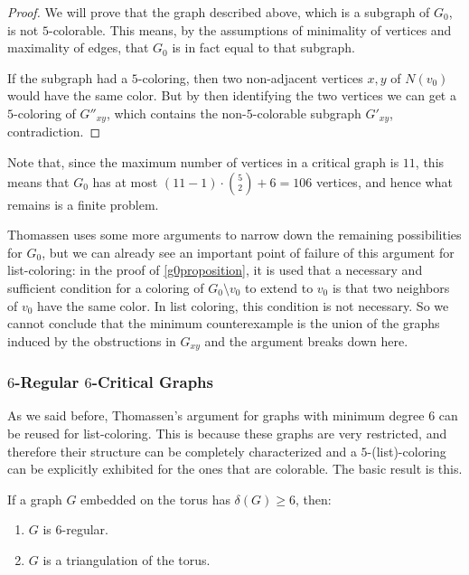 \begin{proof}
We will prove that the graph described above, which is a subgraph of $G_0$, is not $5$-colorable. 
This means, by the assumptions of minimality of vertices and maximality of edges, that $G_0$ is
in fact equal to that subgraph. 

If the subgraph had a $5$-coloring, then two non-adjacent vertices $x, y$ of $N(v_0)$ would 
have the same color. But by then identifying the two vertices we can get a $5$-coloring 
of $G''_{xy}$, which contains the non-$5$-colorable subgraph $G'_{xy}$, contradiction.

\end{proof}

Note that, since the maximum number of vertices in a critical graph is $11$, this means that
$G_0$ has at most $(11 - 1) \cdot \binom{5}{2} + 6 = 106$ vertices, and hence what remains
is a finite problem.

Thomassen uses some more arguments to narrow down the remaining possibilities for $G_0$, but
we can already see an important point of failure of this argument for list-coloring: in the 
proof of \ref{g0proposition}, it is used that a necessary and sufficient condition for a coloring
of $G_0 \setminus v_0$ to extend to $v_0$ is that two neighbors of $v_0$ have the same color.
In list coloring, this condition is not necessary. So we cannot conclude that the minimum 
counterexample is the union of the graphs induced by the obstructions in $G_{xy}$ and the 
argument breaks down here. 



\subsubsection{$6$-Regular $6$-Critical Graphs}

As we said before, Thomassen's argument for graphs with minimum degree $6$ can be reused for list-coloring. This is because these graphs are very restricted, and therefore their structure can be completely characterized and a $5$-(list)-coloring can be explicitly exhibited for the ones that are colorable. The basic result is this.

\begin{proposition}
If a graph $G$ embedded on the torus has $\delta(G) \geq 6$, then:

\begin{enumerate}
	\item $G$ is $6$-regular.
	\item $G$ is a triangulation of the torus.
\end{enumerate}
\end{proposition}

